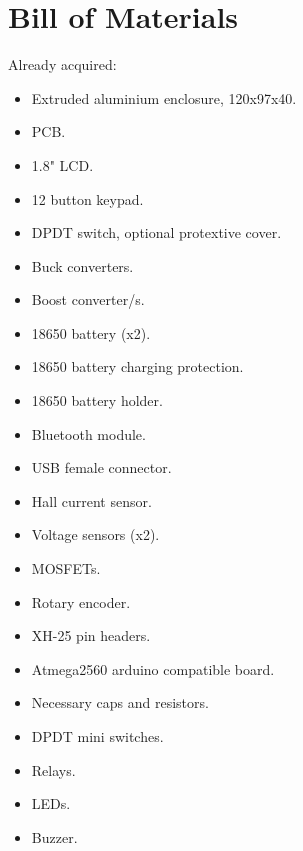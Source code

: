 \documentclass{article}
\begin{document}
\section{Bill of Materials}
Already acquired:

\begin{itemize}
	\item Extruded aluminium enclosure, 120x97x40.
	\item PCB.
	\item 1.8" LCD.
	\item 12 button keypad.
	\item DPDT switch, optional protextive cover.
	\item Buck converters.
	\item Boost converter/s.
	\item 18650 battery (x2).
	\item 18650 battery charging protection.
	\item 18650 battery holder.
	\item Bluetooth module.
	\item USB female connector.
	\item Hall current sensor.
	\item Voltage sensors (x2).
	\item MOSFETs.
	\item Rotary encoder.
	\item XH-25 pin headers.
	\item Atmega2560 arduino compatible board.
	\item Necessary caps and resistors.
	\item DPDT mini switches.
	\item Relays.
	\item LEDs.
	\item Buzzer.
\end{itemize}
\end{document}
